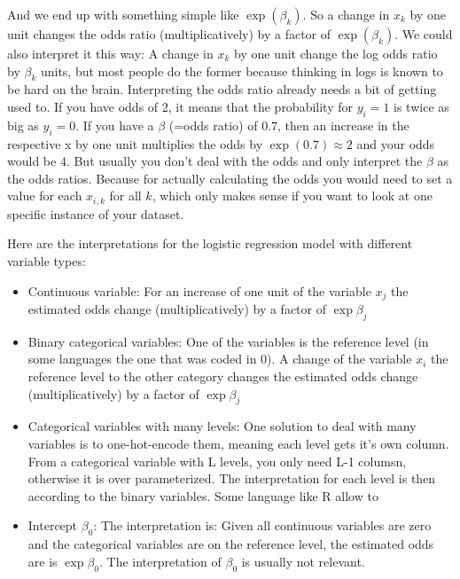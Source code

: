 \documentclass[12pt,]{krantz}
\providecommand{\tightlist}{%
  \setlength{\itemsep}{0pt}\setlength{\parskip}{0pt}}
\theoremstyle{definition}
\theoremstyle{definition}
\theoremstyle{definition}
\theoremstyle{remark}
\begin{document}
And we end up with something simple like \(\exp(\beta_k)\). So a change
in \(x_k\) by one unit changes the odds ratio (multiplicatively) by a
factor of \(\exp(\beta_k)\). We could also interpret it this way: A
change in \(x_k\) by one unit change the log odds ratio by \(\beta_k\)
units, but most people do the former because thinking in logs is known
to be hard on the brain. Interpreting the odds ratio already needs a bit
of getting used to. If you have odds of 2, it means that the probability
for \(y_i = 1\) is twice as big as \(y_i = 0\). If you have a \(\beta\)
(=odds ratio) of \(0.7\), then an increase in the respective x by one
unit multiplies the odds by \(\exp(0.7) \approx 2\) and your odds would
be 4. But usually you don't deal with the odds and only interpret the
\(\beta\) as the odds ratios. Because for actually calculating the odds
you would need to set a value for each \(x_{i,k}\) for all \(k\), which
only makes sense if you want to look at one specific instance of your
dataset.

Here are the interpretations for the logistic regression model with
different variable types:

\begin{itemize}
\tightlist
\item
  Continuous variable: For an increase of one unit of the variable
  \(x_{j}\) the estimated odds change (multiplicatively) by a factor of
  \(\exp{\beta_{j}}\)
\item
  Binary categorical variables: One of the variables is the reference
  level (in some languages the one that was coded in 0). A change of the
  variable \(x_{i}\) the reference level to the other category changes
  the estimated odds change (multiplicatively) by a factor of
  \(\exp{\beta_{j}}\)
\item
  Categorical variables with many levels: One solution to deal with many
  variables is to one-hot-encode them, meaning each level gets it's own
  column. From a categorical variable with L levels, you only need L-1
  columsn, otherwise it is over parameterized. The interpretation for
  each level is then according to the binary variables. Some language
  like R allow to
\item
  Intercept \(\beta_{0}\): The interpretation is: Given all continuous
  variables are zero and the categorical variables are on the reference
  level, the estimated odds are is \(\exp{\beta_{0}}\). The
  interpretation of \(\beta_{0}\) is usually not relevant.
\end{itemize}
\end{document}
